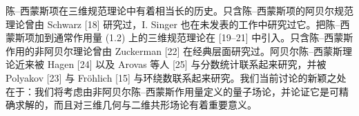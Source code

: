 \documentclass[11pt,a4paper]{article}
\DeclareMathOperator{\Tr}{Tr}
\begin{document}


陈–西蒙斯项在三维规范理论中有着相当长的历史。只含陈–西蒙斯项的阿贝尔规范理论曾由 Schwarz [18] 研究过，I. Singer 也在未发表的工作中研究过它。把陈–西蒙斯项加到通常作用量 (1.2) 上的三维规范理论在 [19–21] 中引入。只含陈–西蒙斯作用的非阿贝尔理论曾由 Zuckerman [22] 在经典层面研究过。阿贝尔陈–西蒙斯理论近来被 Hagen [24] 以及 Arovas 等人 [25] 与分数统计联系起来研究，并被 Polyakov [23] 与 Fröhlich [15] 与环绕数联系起来研究。我们当前讨论的新颖之处在于：我们将考虑由非阿贝尔陈–西蒙斯作用量定义的量子场论，并论证它是可精确求解的，而且对三维几何与二维共形场论有着重要意义。
\end{document}
